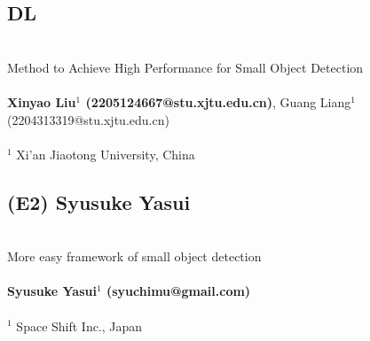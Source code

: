 \documentclass{mva_style}
\begin{document}
\subsection*{DL}
\\ Method to Achieve High Performance for Small Object Detection\\
\\ \textbf{Xinyao Liu$^1$ (2205124667@stu.xjtu.edu.cn)}, Guang Liang$^1$(2204313319@stu.xjtu.edu.cn)\\
\\
$^1$ Xi'an Jiaotong University, China



\subsection*{(E2) Syusuke Yasui}
\\ More easy framework of small object detection\\
\\ \textbf{Syusuke Yasui$^1$ (syuchimu@gmail.com)}\\
\\
$^1$ Space Shift Inc., Japan\\





\end{document}
